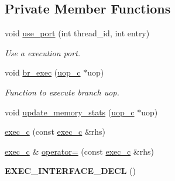 \subsection*{Private Member Functions}
\begin{DoxyCompactItemize}
\item 
void \hyperlink{classexec__c_aa2d516bf192c6f8892de3e7170376188}{use\_\-port} (int thread\_\-id, int entry)
\begin{DoxyCompactList}\small\item\em Use a execution port. \item\end{DoxyCompactList}\item 
void \hyperlink{classexec__c_aae8d2bffafffc61a57df9135e587aa68}{br\_\-exec} (\hyperlink{classuop__c}{uop\_\-c} $\ast$uop)
\begin{DoxyCompactList}\small\item\em Function to execute branch uop. \item\end{DoxyCompactList}\item 
void \hyperlink{classexec__c_a3dc9844d728194997e74785a24484c5b}{update\_\-memory\_\-stats} (\hyperlink{classuop__c}{uop\_\-c} $\ast$uop)
\item 
\hyperlink{classexec__c_a8fc8f5db792210cf7d48640d5201ce19}{exec\_\-c} (const \hyperlink{classexec__c}{exec\_\-c} \&rhs)
\item 
\hyperlink{classexec__c}{exec\_\-c} \& \hyperlink{classexec__c_a910ed659ae2946466f43a5de6450343b}{operator=} (const \hyperlink{classexec__c}{exec\_\-c} \&rhs)
\item 
\hypertarget{classexec__c_aad7dd5899df923e0a0e39226350278fa}{
{\bfseries EXEC\_\-INTERFACE\_\-DECL} ()}
\label{classexec__c_aad7dd5899df923e0a0e39226350278fa}

\end{DoxyCompactItemize}
